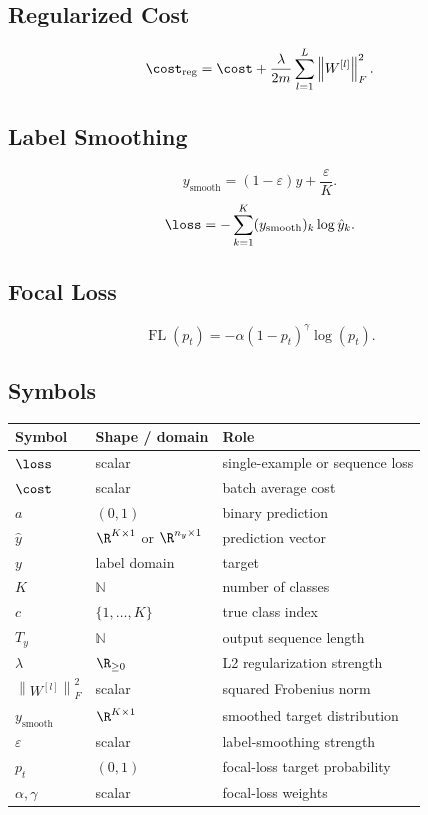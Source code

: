\subsection{Regularized Cost}

\[
\cost_{\mathrm{reg}}
=
\cost
+
\frac{\lambda}{2m}
\sum_{l=1}^{L}
\left\lVert W^{[l]} \right\rVert_F^2.
\]

\subsection{Label Smoothing}

\[
y_{\mathrm{smooth}}
=
(1-\varepsilon)y
+
\frac{\varepsilon}{K}.
\]
\[
\loss
=
-\sum_{k=1}^{K}
(y_{\mathrm{smooth}})_k
\log \hat{y}_k.
\]

\subsection{Focal Loss}

\[
\operatorname{FL}(p_t)
=
-\alpha(1-p_t)^{\gamma}\log(p_t).
\]

\subsection{Symbols}

\begin{center}
\begin{tabular}{lll}
\toprule
Symbol & Shape / domain & Role \\
\midrule
$\loss$ & scalar & single-example or sequence loss \\
$\cost$ & scalar & batch average cost \\
$a$ & $(0,1)$ & binary prediction \\
$\hat{y}$ & $\R^{K \times 1}$ or $\R^{n_y \times 1}$ & prediction vector \\
$y$ & label domain & target \\
$K$ & $\mathbb{N}$ & number of classes \\
$c$ & $\{1,\dots,K\}$ & true class index \\
$T_y$ & $\mathbb{N}$ & output sequence length \\
$\lambda$ & $\R_{\ge 0}$ & L2 regularization strength \\
$\left\lVert W^{[l]} \right\rVert_F^2$ & scalar & squared Frobenius norm \\
$y_{\mathrm{smooth}}$ & $\R^{K \times 1}$ & smoothed target distribution \\
$\varepsilon$ & scalar & label-smoothing strength \\
$p_t$ & $(0,1)$ & focal-loss target probability \\
$\alpha,\gamma$ & scalar & focal-loss weights \\
\bottomrule
\end{tabular}
\end{center}
